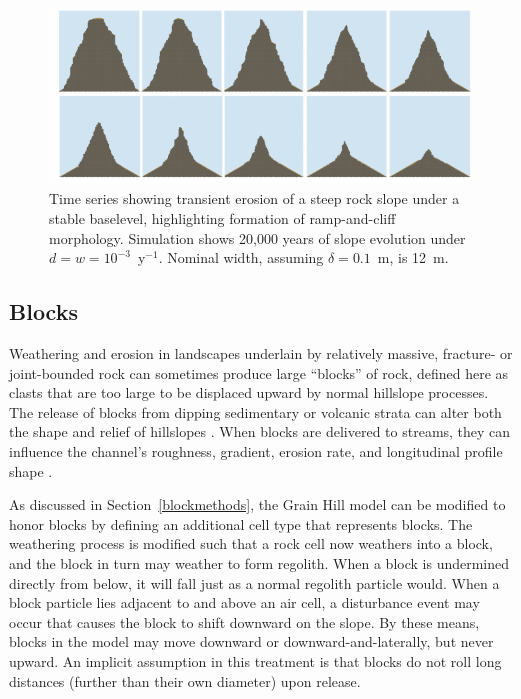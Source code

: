 \documentclass[esurf, manuscript]{copernicus}
\begin{document}
\begin{figure}[t]
\includegraphics[width=12cm]{Figures/ramp_evolution.pdf}
\caption{Time series showing transient erosion of a steep rock slope under a stable baselevel, highlighting formation of ramp-and-cliff morphology. Simulation shows 20,000 years of slope evolution under $d=w=10^{-3}$~y$^{-1}$. Nominal width, assuming $\delta=0.1$~m, is 12~m.}
\label{ramp}
\end{figure}


\subsection{Blocks}

Weathering and erosion in landscapes underlain by relatively massive, fracture- or joint-bounded rock can sometimes produce large ``blocks'' of rock, defined here as clasts that are too large to be displaced upward by normal hillslope processes. The release of blocks from dipping sedimentary or volcanic strata can alter both the shape and relief of hillslopes \citep{glade2017block}. When blocks are delivered to streams, they can influence the channel's roughness, gradient, erosion rate, and longitudinal profile shape \citep{shobe2016hillslope}.

As discussed in Section~\ref{blockmethods}, the Grain Hill model can be modified to honor blocks by defining an additional cell type that represents blocks. The weathering process is modified such that a rock cell now weathers into a block, and the block in turn may weather to form regolith. When a block is undermined directly from below, it will fall just as a normal regolith particle would. When a block particle lies adjacent to and above an air cell, a disturbance event may occur that causes the block to shift downward on the slope. By these means, blocks in the model may move downward or downward-and-laterally, but never upward. An implicit assumption in this treatment is that blocks do not roll long distances (further than their own diameter) upon release.
\end{document}
